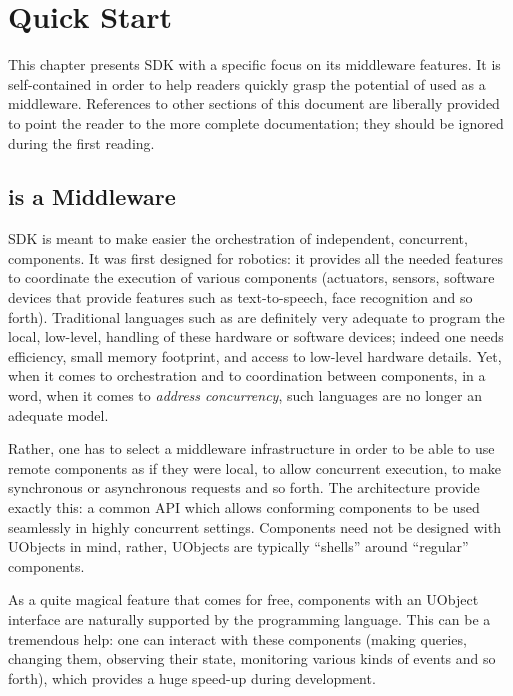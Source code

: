 \chapter{Quick Start}
\label{sec:uob:quick}

This chapter presents \urbi SDK with a specific focus on its
middleware features.  It is self-contained in order to help readers
quickly grasp the potential of \urbi used as a middleware.  References
to other sections of this document are liberally provided to point the
reader to the more complete documentation; they should be ignored
during the first reading.

\section{\urbi is a Middleware}

\urbi SDK is meant to make easier the orchestration of independent,
concurrent, components.  It was first designed for robotics: it
provides all the needed features to coordinate the execution of
various components (actuators, sensors, software devices that provide
features such as text-to-speech, face recognition and so forth).
Traditional languages such as \Cxx are definitely very adequate to
program the local, low-level, handling of these hardware or software
devices; indeed one needs efficiency, small memory footprint, and
access to low-level hardware details.  Yet, when it comes to
orchestration and to coordination between components, in a word, when
it comes to \emph{address concurrency}, such languages are no longer
an adequate model.

Rather, one has to select a middleware infrastructure in order to be
able to use remote components as if they were local, to allow
concurrent execution, to make synchronous or asynchronous requests and
so forth.  The  architecture provide exactly this: a
common API which allows conforming components to be used seamlessly in
highly concurrent settings.  Components need not be designed with
UObjects in mind, rather, UObjects are typically ``shells'' around
``regular'' components.

As a quite magical feature that comes for free, components with an
UObject interface are naturally supported by the \us programming
language.  This can be a tremendous help: one can interact with these
components (making queries, changing them, observing their state,
monitoring various kinds of events and so forth), which provides a
huge speed-up during development.

